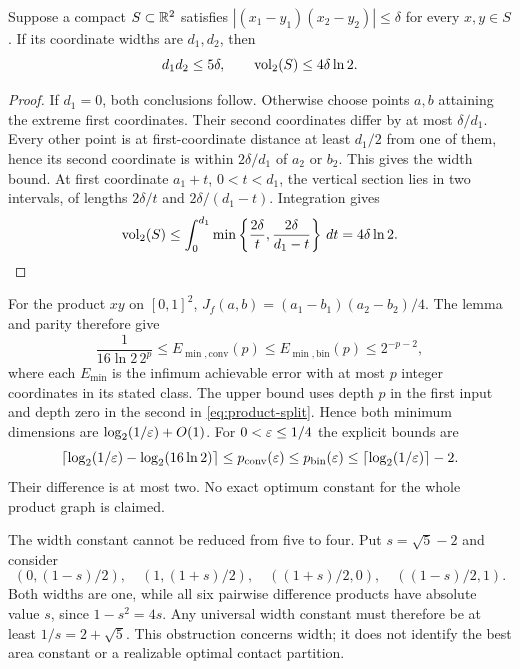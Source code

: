 \begin{lemma}\label{lem:product-width}
Suppose a compact $S\subset\mathbb R^2$ satisfies
$|(x_1-y_1)(x_2-y_2)|\le\delta$ for every $x,y\in S$.
If its coordinate widths are $d_1,d_2$, then
\[
 d_1d_2\le5\delta,\qquad \operatorname{vol}_2(S)\le4\delta\ln2.
\]
\end{lemma}
\begin{proof}
If $d_1=0$, both conclusions follow. Otherwise choose points $a,b$
attaining the extreme first coordinates. Their second coordinates differ
by at most $\delta/d_1$. Every other point is at first-coordinate
distance at least $d_1/2$ from one of them, hence its second coordinate
is within $2\delta/d_1$ of $a_2$ or $b_2$. This gives the width bound.
At first coordinate $a_1+t$, $0<t<d_1$, the vertical section lies in
two intervals, of lengths $2\delta/t$ and $2\delta/(d_1-t)$.
Integration gives
\[
 \operatorname{vol}_2(S)\le
 \int_0^{d_1}\min\left\{\frac{2\delta}{t},
                    \frac{2\delta}{d_1-t}\right\}\,dt
 =4\delta\ln2.
\]
\end{proof}

For the product $xy$ on $[0,1]^2$, $J_f(a,b)=(a_1-b_1)(a_2-b_2)/4$.
The lemma and parity therefore give
\begin{equation}\label{eq:product-finite}
 \frac{1}{16\ln2\,2^p}\le E_{
\min,\mathrm{conv}}(p)\le E_{\min,\mathrm{bin}}(p)\le2^{-p-2},
\end{equation}
where each $E_{\min}$ is the infimum achievable error with at most $p$
integer coordinates in its stated class. The upper bound uses depth
$p$ in the first input and depth zero in the second in
\eqref{eq:product-split}. Hence both minimum dimensions are
$\log_2(1/\varepsilon)+O(1)$. For $0<\varepsilon\le1/4$ the explicit bounds are
\[
 \left\lceil\log_2(1/\varepsilon)-\log_2(16\ln2)\right\rceil
 \le p_{\mathrm{conv}}(\varepsilon)\le p_{\mathrm{bin}}(\varepsilon)
 \le\lceil\log_2(1/\varepsilon)\rceil-2.
\]
Their difference is at most two. No exact optimum constant for the
whole product graph is claimed.

The width constant cannot be reduced from five to four. Put
$s=\sqrt5-2$ and consider
\[
 (0,(1-s)/2),\quad (1,(1+s)/2),\quad
 ((1+s)/2,0),\quad ((1-s)/2,1).
\]
Both widths are one, while all six pairwise difference products have
absolute value $s$, since $1-s^2=4s$. Any universal width constant must
therefore be at least $1/s=2+\sqrt5$. This obstruction concerns width;
it does not identify the best area constant or a realizable optimal
contact partition.

